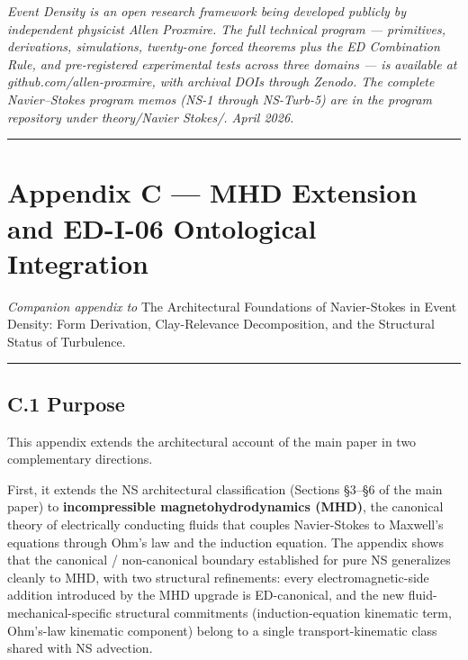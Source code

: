 \documentclass[
]{article}
\begin{document}
\emph{Event Density is an open research framework being developed
publicly by independent physicist Allen Proxmire. The full technical
program --- primitives, derivations, simulations, twenty-one forced
theorems plus the ED Combination Rule, and pre-registered experimental
tests across three domains --- is available at
github.com/allen-proxmire, with archival DOIs through Zenodo. The
complete Navier--Stokes program memos (NS-1 through NS-Turb-5) are in
the program repository under theory/Navier Stokes/. April 2026.}

\begin{center}\rule{0.5\linewidth}{0.5pt}\end{center}

\section{Appendix C --- MHD Extension and ED-I-06 Ontological
Integration}\label{appendix-c-mhd-extension-and-ed-i-06-ontological-integration}

\emph{Companion appendix to} The Architectural Foundations of
Navier-Stokes in Event Density: Form Derivation, Clay-Relevance
Decomposition, and the Structural Status of Turbulence.

\begin{center}\rule{0.5\linewidth}{0.5pt}\end{center}

\subsection{C.1 Purpose}\label{c.1-purpose}

This appendix extends the architectural account of the main paper in two
complementary directions.

First, it extends the NS architectural classification (Sections §3--§6
of the main paper) to \textbf{incompressible magnetohydrodynamics
(MHD)}, the canonical theory of electrically conducting fluids that
couples Navier-Stokes to Maxwell's equations through Ohm's law and the
induction equation. The appendix shows that the canonical /
non-canonical boundary established for pure NS generalizes cleanly to
MHD, with two structural refinements: every electromagnetic-side
addition introduced by the MHD upgrade is ED-canonical, and the new
fluid-mechanical-specific structural commitments (induction-equation
kinematic term, Ohm's-law kinematic component) belong to a single
transport-kinematic class shared with NS advection.
\end{document}
